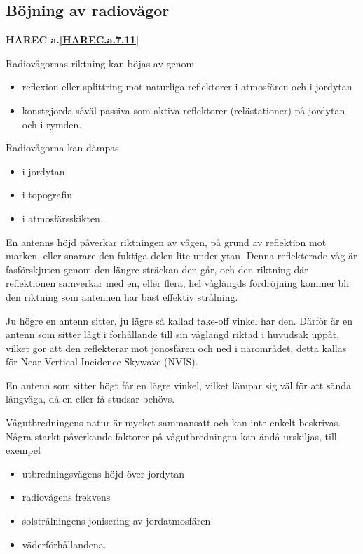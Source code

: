\subsection{Böjning av radiovågor}
\textbf{HAREC a.\ref{HAREC.a.7.11}\label{myHAREC.a.7.11}}

Radiovågornas riktning kan böjas av genom
\begin{itemize}
  \item reflexion eller splittring mot naturliga reflektorer i
  atmosfären och i jordytan
  \item konstgjorda såväl passiva som aktiva reflektorer (relästationer)
  på jordytan och i rymden.
\end{itemize}

Radiovågorna kan dämpas
\begin{itemize}
  \item i jordytan
  \item i topografin
  \item i atmosfärsskikten.
\end{itemize}

En antenns höjd påverkar riktningen av vågen, på grund av reflektion mot
marken, eller snarare den fuktiga delen lite under ytan.
Denna reflekterade våg är fasförskjuten genom den längre sträckan den går,
och den riktning där reflektionen samverkar med en, eller flera, hel våglängds
fördröjning kommer bli den riktning som antennen har bäst effektiv strålning.

Ju högre en antenn sitter, ju lägre så kallad take-off vinkel har den.
Därför är en antenn som sitter lågt i förhållande till sin våglängd riktad i
huvudsak uppåt, vilket gör att den reflekterar mot jonosfären och ned i
närområdet, detta kallas för Near Vertical Incidence Skywave (NVIS).

En antenn som sitter högt får en lägre vinkel, vilket lämpar sig väl för att
sända långväga, då en eller få studsar behövs.

Vågutbredningens natur är mycket sammansatt och kan inte enkelt beskrivas.
Några starkt påverkande faktorer på vågutbredningen kan ändå urskiljas, till exempel
\begin{itemize}
  \item utbredningsvägens höjd över jordytan
  \item radiovågens frekvens
  \item solstrålningens jonisering av jordatmosfären
  \item väderförhållandena.
\end{itemize}

